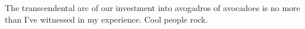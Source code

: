 

The transcendental arc of our investment into avogadros of avocadoes
is no more than I've witnessed in my experience.  Cool people rock.

\bye
